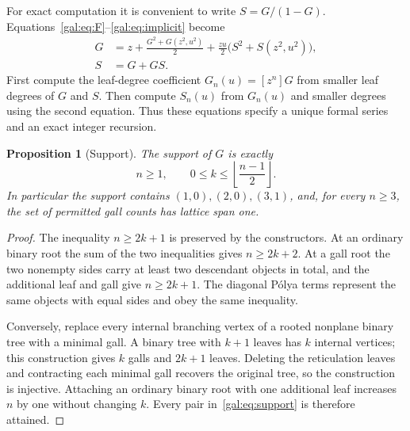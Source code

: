\documentclass[11pt,letterpaper]{article}
\numberwithin{equation}{section}
\newtheorem{proposition}[theorem]{Proposition}
\theoremstyle{definition}\newtheorem{definition}[theorem]{Definition}
\theoremstyle{remark}\newtheorem{remark}[theorem]{Remark}
\begin{document}
For exact computation it is convenient to write $S=G/(1-G)$. Equations~\eqref{gal:eq:F}--\eqref{gal:eq:implicit} become
\begin{equation}\label{gal:eq:GS}
\begin{split}
G&=z+\frac{G^2+G(z^2,u^2)}2
       +\frac{zu}{2}\bigl(S^2+S(z^2,u^2)\bigr),\\
S&=G+GS.
\end{split}
\end{equation}
First compute the leaf-degree coefficient $G_n(u)=[z^n]G$ from smaller leaf degrees of $G$ and $S$. Then compute $S_n(u)$ from $G_n(u)$ and smaller degrees using the second equation. Thus these equations specify a unique formal series and an exact integer recursion.

\begin{proposition}[Support]\label{gal:prop:support}
The support of $G$ is exactly
\begin{equation}\label{gal:eq:support}
 n\geq1,\qquad 0\leq k\leq\left\lfloor\frac{n-1}2\right\rfloor.
\end{equation}
In particular the support contains $(1,0),(2,0),(3,1)$, and, for every $n\geq3$, the set of permitted gall counts has lattice span one.
\end{proposition}
\begin{proof}
The inequality $n\geq2k+1$ is preserved by the constructors. At an ordinary binary root the sum of the two inequalities gives $n\geq2k+2$. At a gall root the two nonempty sides carry at least two descendant objects in total, and the additional leaf and gall give $n\geq2k+1$. The diagonal P\'olya terms represent the same objects with equal sides and obey the same inequality.

Conversely, replace every internal branching vertex of a rooted nonplane binary tree with a minimal gall. A binary tree with $k+1$ leaves has $k$ internal vertices; this construction gives $k$ galls and $2k+1$ leaves. Deleting the reticulation leaves and contracting each minimal gall recovers the original tree, so the construction is injective. Attaching an ordinary binary root with one additional leaf increases $n$ by one without changing $k$. Every pair in~\eqref{gal:eq:support} is therefore attained.
\end{proof}
\end{document}
